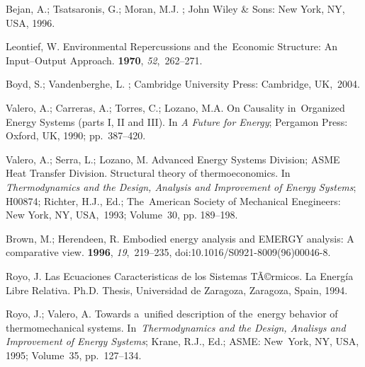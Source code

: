 \documentclass[energies,article,accept,moreauthors,pdftex]{Definitions/mdpi}
\begin{document}
\begin{thebibliography}{999}
	
	Bejan, A.; Tsatsaronis, G.; Moran, M.J.
	;
	John Wiley \& Sons: New York, NY, USA, 1996.
	
	
	Leontief, W.
	\newblock Environmental {R}epercussions and the~{E}conomic {S}tructure: {A}n
	{I}nput--{O}utput {A}pproach.
	 {\bf 1970}, {\em
		52},~262--271.

	
	Boyd, S.; Vandenberghe, L.
	; Cambridge University Press: Cambridge, UK,~2004.

	
	Valero, A.; Carreras, A.; Torres, C.; Lozano, M.A.
	\newblock On {C}ausality in~{O}rganized {E}nergy {S}ystems (parts {I}, {II} and
	{III}).
	\newblock  In {\em A Future for Energy}; Pergamon Press: Oxford, UK, 1990; pp.~387--420.

	
	Valero, A.; Serra, L.; Lozano, M. Advanced Energy Systems Division; ASME Heat Transfer Division.
	\newblock Structural theory of thermoeconomics.
	\newblock  In {\em Thermodynamics and the Design, Analysis and Improvement of Energy Systems}; H00874; Richter, H.J., Ed.; The~American Society of
	Mechanical Enegineers: New York, NY, USA,~1993; Volume~30, pp. 189--198. 

	

	
	Brown, M.; Herendeen, R.
	\newblock Embodied energy analysis and EMERGY analysis: A comparative view.
	 {\bf 1996}, {\em 19},~219--235, doi:10.1016/S0921-8009(96)00046-8.

	
	Royo, J.
	\newblock Las Ecuaciones Caracteristicas de los Sistemas TÃ©rmicos. {L}a
	Energía Libre Relativa.
	\newblock Ph.D. Thesis, Universidad de Zaragoza, Zaragoza, Spain, 1994.

	
	Royo, J.; Valero, A.
	\newblock Towards a~unified description of the~energy behavior of
	thermomechanical systems.
	\newblock  In~{\em Thermodynamics and the Design, Analisys and Improvement of Energy Systems}; Krane, R.J., Ed.; ASME: New~York, NY, USA, 1995; Volume~35, pp.~127--134.


\end{thebibliography}
\end{document}

